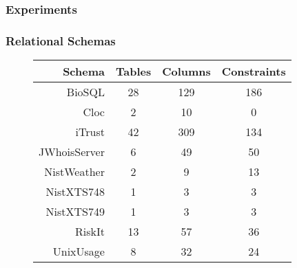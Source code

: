  \begin{frame}
        \frametitle{Experiments}
        \centering
        
        
\end{frame}

\begin{frame}
  \frametitle{Relational Schemas}

  \begin{figure}
  \begin{center}
  {\normalsize
  \begin{tabular}{r | c c c}
                           Schema & Tables & Columns & Constraints \\ \hline
    BioSQL                        & 28     & 129     & 186 \\
    Cloc                          & 2      & 10      & 0 \\
    iTrust                        & 42     & 309     & 134 \\
    JWhoisServer                  & 6      & 49      & 50 \\
    NistWeather                   & 2      & 9       & 13 \\
    NistXTS748                    & 1      & 3       & 3 \\
    NistXTS749                    & 1      & 3       & 3 \\
    RiskIt                        & 13     & 57      & 36 \\
    UnixUsage                     & 8      & 32      & 24
\end{tabular}}
\end{center}
\end{figure}



\begin{minipage}{1.5in}
\begin{figure}
\begin{centering}
\end{centering}
\end{figure}
\end{minipage}


\end{frame}
